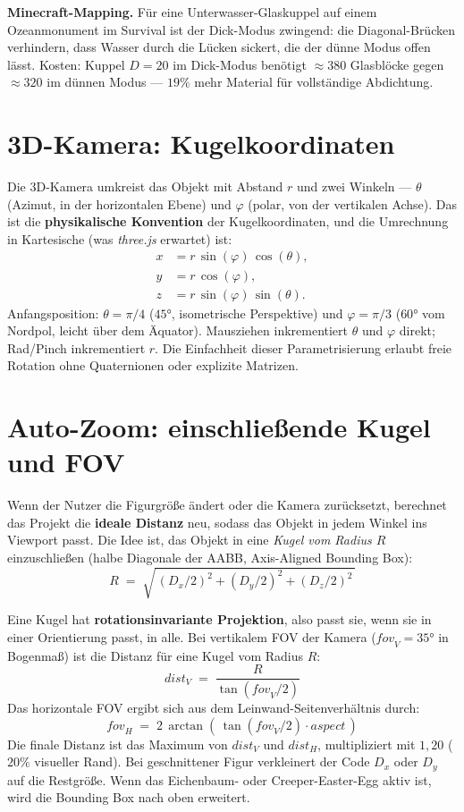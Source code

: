 \documentclass[12pt,a4paper]{scrartcl}
\newcommand{\acc}[1]{\textcolor{accent}{\textbf{#1}}}
\begin{document}
\begin{minec}
\textbf{Minecraft-Mapping.} Für eine Unterwasser-Glaskuppel auf einem Ozeanmonument im Survival ist der Dick-Modus zwingend: die Diagonal-Brücken verhindern, dass Wasser durch die Lücken sickert, die der dünne Modus offen lässt. Kosten: Kuppel $D=20$ im Dick-Modus benötigt $\approx 380$ Glasblöcke gegen $\approx 320$ im dünnen Modus --- $19\%$ mehr Material für vollständige Abdichtung.
\end{minec}

\section{3D-Kamera: Kugelkoordinaten}

Die 3D-Kamera umkreist das Objekt mit Abstand $r$ und zwei Winkeln --- $\theta$ (Azimut, in der horizontalen Ebene) und $\varphi$ (polar, von der vertikalen Achse). Das ist die \acc{physikalische Konvention} der Kugelkoordinaten, und die Umrechnung in Kartesische (was \emph{three.js} erwartet) ist:
\[
\begin{aligned}
x &= r\,\sin(\varphi)\,\cos(\theta), \\
y &= r\,\cos(\varphi), \\
z &= r\,\sin(\varphi)\,\sin(\theta).
\end{aligned}
\]
Anfangsposition: $\theta = \pi/4$ ($45°$, isometrische Perspektive) und $\varphi = \pi/3$ ($60°$ vom Nordpol, leicht über dem Äquator). Mausziehen inkrementiert $\theta$ und $\varphi$ direkt; Rad/Pinch inkrementiert $r$. Die Einfachheit dieser Parametrisierung erlaubt freie Rotation ohne Quaternionen oder explizite Matrizen.

\section{Auto-Zoom: einschließende Kugel und FOV}

Wenn der Nutzer die Figurgröße ändert oder die Kamera zurücksetzt, berechnet das Projekt die \acc{ideale Distanz} neu, sodass das Objekt in jedem Winkel ins Viewport passt. Die Idee ist, das Objekt in eine \emph{Kugel vom Radius $R$} einzuschließen (halbe Diagonale der AABB, Axis-Aligned Bounding Box):
\[
R \;=\; \sqrt{\,(D_x/2)^2 + (D_y/2)^2 + (D_z/2)^2\,}
\]

Eine Kugel hat \acc{rotationsinvariante Projektion}, also passt sie, wenn sie in einer Orientierung passt, in alle. Bei vertikalem FOV der Kamera ($\mathit{fov}_V = 35°$ in Bogenmaß) ist die Distanz für eine Kugel vom Radius $R$:
\[
\mathit{dist}_V \;=\; \dfrac{R}{\tan(\mathit{fov}_V / 2)}
\]
Das horizontale FOV ergibt sich aus dem Leinwand-Seitenverhältnis durch:
\[
\mathit{fov}_H \;=\; 2\,\arctan\!\left(\,\tan(\mathit{fov}_V/2)\cdot \mathit{aspect}\,\right)
\]
Die finale Distanz ist das Maximum von $\mathit{dist}_V$ und $\mathit{dist}_H$, multipliziert mit $1{,}20$ ($20\%$ visueller Rand). Bei geschnittener Figur verkleinert der Code $D_x$ oder $D_y$ auf die Restgröße. Wenn das Eichenbaum- oder Creeper-Easter-Egg aktiv ist, wird die Bounding Box nach oben erweitert.
\end{document}
